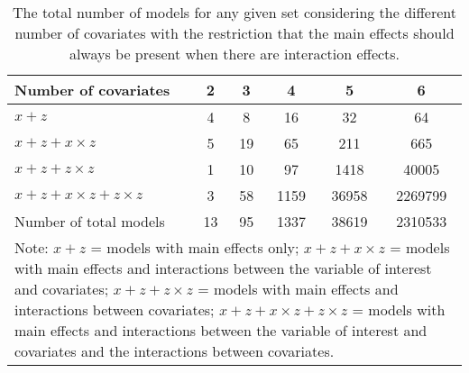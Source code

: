 \begin{table}[!h]
\centering
\caption{The total number of models for any given set considering the different number of covariates with the restriction that the main effects should always be present when there are interaction effects.} 
\begin{tabular}{lccccc}
  \hline
Number of covariates & 2 & 3 & 4 & 5 & 6 \\
  \hline
$x + z$ & 4 & 8 & 16 & 32 & 64 \\ 
  $x + z + x \times z$ & 5 & 19 & 65 & 211 & 665 \\ 
  $x + z + z \times z$ & 1 & 10 & 97 & 1418 & 40005 \\ 
  $x + z+ x \times z + z \times z$ & 3 & 58 & 1159 & 36958 & 2269799 \\ 
  \hline
  Number of total models & 13 & 95 & 1337 & 38619 & 2310533 \\ 
   \hline 
\multicolumn{6}{p{12cm}}{\footnotesize{Note: $x + z$ = models with main effects only; $x + z + x \times z$ = models with main effects and interactions between the variable of interest and covariates; $x + z + z \times z$ = models with main effects and interactions between covariates; $x + z + x \times z + z \times z$ = models with main effects and interactions between the variable of interest and covariates and the interactions between covariates.}} 
\end{tabular}
\end{table}
